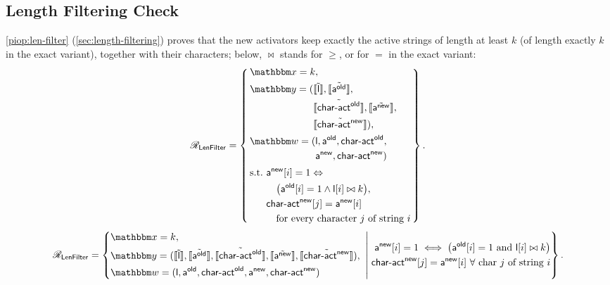 \subsection{Length Filtering Check}
\label{sec:proof-lenfilter}
\cref{piop:len-filter} (\cref{sec:length-filtering}) proves that the new activators keep exactly the active strings of length at least $k$ (of length exactly $k$ in the exact variant), together with their characters; below, ${\bowtie}$ stands for $\geq$, or for $=$ in the exact variant:
\ifsp
\begin{equation*}
\NPRelation_{\mathsf{LenFilter}} = \left\{\,
\begin{aligned}
  & \NPInstance = k,\\
  & \NPInstancey = (\Oracle{\MLE{\mathsf{l}}}, \Oracle{\MLE{\mathsf{a}^{\mathsf{old}}}},\\
  & \phantom{\NPInstancey = (}\Oracle{\MLE{\mathsf{char\text{-}act}^{\mathsf{old}}}}, \Oracle{\MLE{\mathsf{a}^{\mathsf{new}}}},\\
  & \phantom{\NPInstancey = (}\Oracle{\MLE{\mathsf{char\text{-}act}^{\mathsf{new}}}}),\\
  & \NPWitness = (\mathsf{l}, \mathsf{a}^{\mathsf{old}}, \mathsf{char\text{-}act}^{\mathsf{old}},\\
  & \phantom{\NPWitness = (}\mathsf{a}^{\mathsf{new}}, \mathsf{char\text{-}act}^{\mathsf{new}})\\[2pt]
  & \text{s.t.}\ \mathsf{a}^{\mathsf{new}}[i] = 1 \Leftrightarrow{}\\
  & \phantom{\text{s.t.}}\ \quad \bigl(\mathsf{a}^{\mathsf{old}}[i] = 1 \wedge \mathsf{l}[i]\bowtie k\bigr),\\
  & \phantom{\text{s.t.}}\ \mathsf{char\text{-}act}^{\mathsf{new}}[j] = \mathsf{a}^{\mathsf{new}}[i]\\
  & \phantom{\text{s.t.}}\ \quad \text{for every character } j \text{ of string } i
\end{aligned}
\,\right\}.
\end{equation*}
\else
\begin{equation*}
\NPRelation_{\mathsf{LenFilter}} = \left\{
\begin{aligned}
  & \NPInstance = k,\; \\
  & \NPInstancey = (\Oracle{\MLE{\mathsf{l}}}, \Oracle{\MLE{\mathsf{a}^{\mathsf{old}}}}, \Oracle{\MLE{\mathsf{char\text{-}act}^{\mathsf{old}}}}, \Oracle{\MLE{\mathsf{a}^{\mathsf{new}}}}, \Oracle{\MLE{\mathsf{char\text{-}act}^{\mathsf{new}}}}),\; \\
  & \NPWitness = (\mathsf{l}, \mathsf{a}^{\mathsf{old}}, \mathsf{char\text{-}act}^{\mathsf{old}}, \mathsf{a}^{\mathsf{new}}, \mathsf{char\text{-}act}^{\mathsf{new}})
\end{aligned}
   \;\middle|\; 
    \begin{aligned}
   \mathsf{a}^{\mathsf{new}}[i] = 1 \iff \bigl(\mathsf{a}^{\mathsf{old}}[i] = 1 \ \text{and}\ \mathsf{l}[i]\bowtie k\bigr) \\
    \mathsf{char\text{-}act}^{\mathsf{new}}[j] = \mathsf{a}^{\mathsf{new}}[i]\ \forall\text{ char } j \text{ of string } i
    \end{aligned}
\right\}.
\end{equation*}
